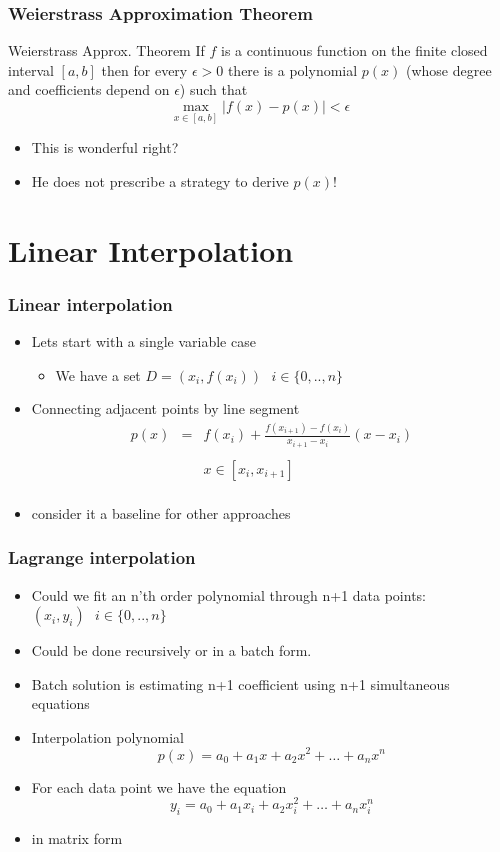 \documentclass[10pt]{beamer}
\begin{document}
\begin{frame}
  \frametitle{Weierstrass Approximation Theorem}
  \begin{block}{Weierstrass Approx. Theorem}
    If $f$ is a continuous function on the finite closed interval
    $[a, b]$ then for every $\epsilon > 0$ there is a polynomial
    $p(x)$ (whose degree and coefficients depend on $\epsilon$) such
    that
    \[
      \max_{x\in[a,b]} | f(x) - p(x) | < \epsilon
    \]
  \end{block}
  \begin{itemize}
  \item This is wonderful right?
    \pause
  \item He does not prescribe a strategy to derive $p(x)$!
  \end{itemize}
\end{frame}

\section{Linear Interpolation}


\begin{frame}
  \frametitle{Linear interpolation}
  \begin{itemize}
  \item Lets start with a single variable case
    \begin{itemize}
    \item We have a set $D = (x_i, f(x_i)) \mbox {   } i\in \{ 0, .., n \}$
    \end{itemize}
  \item Connecting adjacent points by line segment
    \[
      \begin{array}{lll}
        p(x) & = &  f(x_i) + \frac{f(x_{i+1}) - f(x_i)}{x_{i+1} - x_i} (x - x_i)\\ & & \\
             &   &  x\in [x_i, x_{i+1}]\\
      \end{array}
    \]
  \item consider it a baseline for other approaches
  \end{itemize}
\end{frame}

\begin{frame}
  \frametitle{Lagrange interpolation}
  \begin{itemize}
  \item Could we fit an n'th order polynomial through n+1 data points:  $(x_i, y_i) \mbox {   } i\in \{ 0, .., n \}$
  \item Could be done recursively or in a batch form.
  \item Batch solution is estimating n+1 coefficient using n+1 simultaneous equations
    \pause
  \item Interpolation polynomial
    \[
      p(x) = a_0 + a_1 x + a_2 x^2 + \ldots + a_n x^n
    \]
  \item For each data point we have the equation
    \[
      y_i = a_0 + a_1 x_i + a_2 x_i^2 + \ldots + a_n x_i^n
    \]
  \item in matrix form    
  \end{itemize}
\end{frame}
\end{document}
